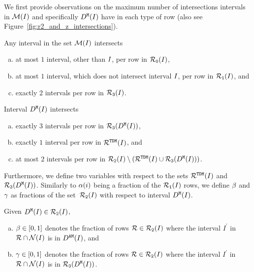 {\medskip

We first provide observations on the maximum number of intersections intervals in $\mathcal{M}(I)$ and specifically $D^\texttt{M}(I)$ have in each type of row (also see Figure~\ref{fig:r2_and_z_intersections}).

\begin{observation}
    \label{obs:any_r2}
    Any interval in the set $\mathcal{M}(I)$ intersects
    \begin{enumerate}[(a)]
        \item at most $1$ interval, other than $I$, per row in $\mathcal{R}_\texttt{0}(I)$,
        \item at most $1$ interval, which does not intersect interval $I$, per row in $\mathcal{R}_\texttt{1}(I)$, and
        \item exactly $2$ intervals per row in $\mathcal{R}_\texttt{3}(I)$.
    \end{enumerate}
\end{observation}

\begin{observation}
    \label{obs:any_z}
    Interval $D^\texttt{M}(I)$ intersects
    \begin{enumerate}[(a)]
        \item exactly $3$ intervals per row in $\mathcal{R}_\texttt{3}(D^\texttt{M}(I))$,
        \item exactly $1$ interval per row in $\mathcal{R}^{\texttt{TDM}}(I)$, and
        \item at most $2$ intervals per row in $\mathcal{R}_\texttt{2}(I) \setminus \left( \mathcal{R}^{\texttt{TDM}}(I) \cup \mathcal{R}_\texttt{3}(D^\texttt{M}(I)) \right)$.
    \end{enumerate}
\end{observation}

Furthermore, we define two variables with respect to the sets $\mathcal{R}^{\texttt{TDM}}(I)$ and $\mathcal{R}_\texttt{3}(D^\texttt{M}(I))$.
Similarly to $\alpha(i)$ being a fraction of the $\mathcal{R}_\texttt{1}(I)$ rows, we define $\beta $ and $\gamma $ as fractions of the set~$\mathcal{R}_\texttt{2}(I)$ with respect to interval $D^\texttt{M}(I)$.

\begin{definition}
    \label{def:gamma_delta}
    Given $D^\texttt{M}(I) \in \mathcal{R}_\texttt{2}(I)$, 
    \begin{enumerate}[(a)]
        \item $\beta \in [0,1]$ denotes the fraction of rows $\mathcal{R} \in \mathcal{R}_\texttt{2}(I)$ where the interval $I^\prime$ in $\mathcal{R} \cap \mathcal{N}(I)$ is in $D^\texttt{AM}(I)$, and
        \item $\gamma \in [0,1]$ denotes the fraction of rows $\mathcal{R} \in \mathcal{R}_\texttt{2}(I)$ where the interval $I^\prime$ in $\mathcal{R} \cap \mathcal{N}(I)$ is in $\mathcal{R}_\texttt{3}(D^\texttt{M}(I))$.
    \end{enumerate}
\end{definition}

}
